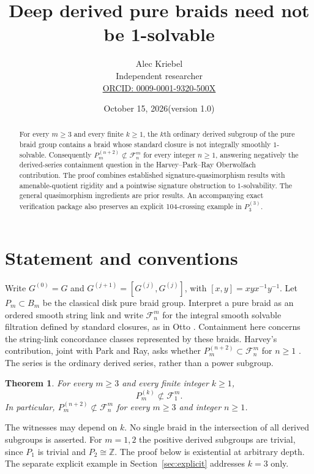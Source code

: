 \documentclass[11pt]{article}
\title{Deep derived pure braids need not be 1-solvable}
\author{Alec Kriebel\\Independent researcher\\
\small\href{https://orcid.org/0009-0001-9320-500X}{ORCID: 0009-0001-9320-500X}}
\date{October 15, 2026\quad (version 1.0)}
\newtheorem{theorem}{Theorem}
\newcommand{\Z}{\mathbb Z}
\newcommand{\F}{\mathcal F}
\begin{document}
\maketitle
\begin{abstract}
For every $m\geq3$ and every finite $k\geq1$, the $k$th ordinary
derived subgroup of the pure braid group contains a braid whose standard
closure is not integrally smoothly $1$-solvable. Consequently
$P_m^{(n+2)}\not\subset\F_n^m$ for every integer $n\geq1$,
answering negatively the derived-series containment question in the
Harvey--Park--Ray Oberwolfach contribution.
The proof combines established signature-quasimorphism results with
amenable-quotient rigidity and a pointwise signature obstruction to
$1$-solvability. The general quasimorphism ingredients are prior results.
An accompanying exact verification package also preserves an explicit
104-crossing example in $P_3^{(3)}$.
\end{abstract}

\section{Statement and conventions}
Write $G^{(0)}=G$ and $G^{(j+1)}=[G^{(j)},G^{(j)}]$, with
$[x,y]=xyx^{-1}y^{-1}$. Let $P_m\subset B_m$ be the classical disk pure
braid group. Interpret a pure braid as an ordered smooth string link and
write $\F_n^m$ for the integral smooth solvable filtration defined by
standard closures, as in Otto \cite[Definition 2.3]{Otto}.
Containment here concerns the string-link concordance classes represented
by these braids. Harvey's contribution, joint with Park and Ray,
asks whether $P_m^{(n+2)}\subset\F_n^m$ for $n\geq1$
\cite[Question 3, p.3021]{HPR}.
The series is the ordinary derived series, rather than a power subgroup.

\begin{theorem}\label{thm:main}
For every $m\geq3$ and every finite integer $k\geq1$,
\[
 P_m^{(k)}\not\subset\F_1^m.
\]
In particular, $P_m^{(n+2)}\not\subset\F_n^m$ for every $m\geq3$
and integer $n\geq1$.
\end{theorem}

The witnesses may depend on $k$. No single braid in the intersection of
all derived subgroups is asserted. For $m=1,2$ the positive derived
subgroups are trivial, since $P_1$ is trivial and $P_2\cong\Z$.
The proof below is existential at arbitrary depth. The separate explicit
example in Section~\ref{sec:explicit} addresses $k=3$ only.
\end{document}
